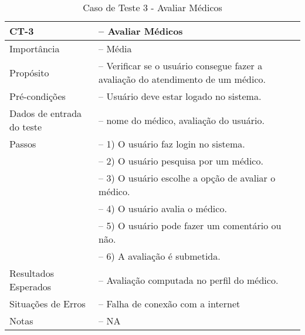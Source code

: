 \begin{anexosenv}
\begin{longtable}{p{4cm}>{-- }p{9cm}}
  \caption{Caso de Teste 3 - Avaliar Médicos}\label{tab:ct3} \\
  \toprule
  \noindent
  CT-3                      & Avaliar Médicos\\ \midrule
  Importância               & Média \\ \midrule
  Propósito                 & Verificar se o usuário consegue fazer a avaliação do atendimento de um médico.\\ \midrule
  Pré-condições             & Usuário deve estar logado no sistema.\\ \midrule
  Dados de entrada do teste & nome do médico, avaliação do usuário.\\ \midrule
  Passos                    & 1)  O usuário faz login no sistema.\\
                            & 2) O usuário pesquisa por um médico.\\
                            & 3) O usuário escolhe a opção de avaliar o médico.\\
                            & 4) O usuário avalia o médico.\\
                            & 5) O usuário pode fazer um comentário ou não.\\
                            & 6) A avaliação é submetida.\\ \midrule
  Resultados Esperados      & Avaliação computada no perfil do médico.\\ \midrule
  Situações de Erros        & Falha de conexão com a internet\\ \midrule
  Notas                     & NA                              \\ \bottomrule
\end{longtable}


\end{anexosenv}
